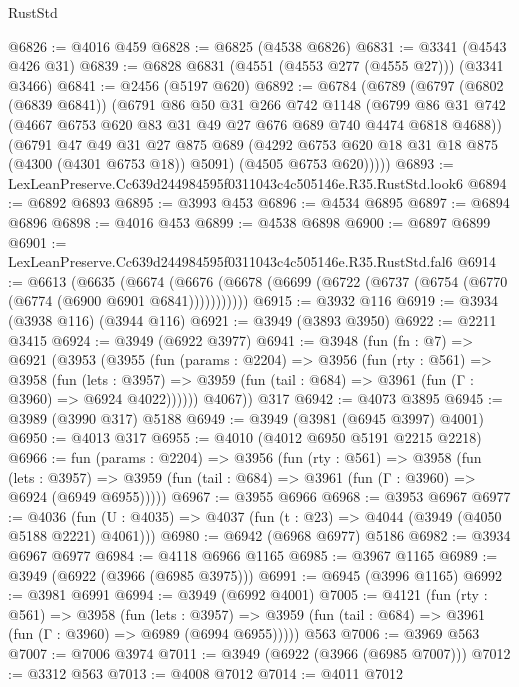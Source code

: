 \begin{lexlean}{RustStd}
\begin{coremodule}
@6826 := @4016 @459
@6828 := @6825 (@4538 @6826)
@6831 := @3341 (@4543 @426 @31)
@6839 := @6828 @6831 (@4551 (@4553 @277 (@4555 @27))) (@3341 @3466)
@6841 := @2456 (@5197 @620)
@6892 := @6784
    (@6789
      (@6797
        (@6802 (@6839 @6841))
        (@6791
          @86
          @50
          @31
          @266
          @742
          @1148
          (@6799 @86 @31 @742 (@4667 @6753 @620 @83 @31 @49 @27 @676 @689 @740 @4474 @6818 @4688))
          (@6791
            @47
            @49
            @31
            @27
            @875
            @689
            (@4292 @6753 @620 @18 @31 @18 @875 (@4300 (@4301 @6753 @18)) @5091)
            (@4505 @6753 @620)))))
@6893 := LexLeanPreserve.Cc639d244984595f0311043c4c505146e.R35.RustStd.look6
@6894 := @6892 @6893
@6895 := @3993 @453
@6896 := @4534 @6895
@6897 := @6894 @6896
@6898 := @4016 @453
@6899 := @4538 @6898
@6900 := @6897 @6899
@6901 := LexLeanPreserve.Cc639d244984595f0311043c4c505146e.R35.RustStd.fal6
@6914 := @6613
    (@6635
      (@6674 (@6676 (@6678 (@6699 (@6722 (@6737 (@6754 (@6770 (@6774 (@6900 @6901 @6841)))))))))))
@6915 := @3932 @116
@6919 := @3934 (@3938 @116) (@3944 @116)
@6921 := @3949 (@3893 @3950)
@6922 := @2211 @3415
@6924 := @3949 (@6922 @3977)
@6941 := @3948
    (fun (fn : @7) =>
    @6921
      (@3953
        (@3955
          (fun (params : @2204) =>
          @3956
            (fun (rty : @561) =>
            @3958
              (fun (lets : @3957) =>
              @3959 (fun (tail : @684) => @3961 (fun (Γ : @3960) => @6924 @4022))))))
        @4067))
    @317
@6942 := @4073 @3895
@6945 := @3989 (@3990 @317) @5188
@6949 := @3949 (@3981 (@6945 @3997) @4001)
@6950 := @4013 @317
@6955 := @4010 (@4012 @6950 @5191 @2215 @2218)
@6966 := fun (params : @2204) =>
  @3956
    (fun (rty : @561) =>
    @3958
      (fun (lets : @3957) =>
      @3959 (fun (tail : @684) => @3961 (fun (Γ : @3960) => @6924 (@6949 @6955)))))
@6967 := @3955 @6966
@6968 := @3953 @6967
@6977 := @4036 (fun (U : @4035) => @4037 (fun (t : @23) => @4044 (@3949 (@4050 @5188 @2221) @4061)))
@6980 := @6942 (@6968 @6977) @5186
@6982 := @3934 @6967 @6977
@6984 := @4118 @6966 @1165
@6985 := @3967 @1165
@6989 := @3949 (@6922 (@3966 (@6985 @3975)))
@6991 := @6945 (@3996 @1165)
@6992 := @3981 @6991
@6994 := @3949 (@6992 @4001)
@7005 := @4121
    (fun (rty : @561) =>
    @3958
      (fun (lets : @3957) =>
      @3959 (fun (tail : @684) => @3961 (fun (Γ : @3960) => @6989 (@6994 @6955)))))
    @563
@7006 := @3969 @563
@7007 := @7006 @3974
@7011 := @3949 (@6922 (@3966 (@6985 @7007)))
@7012 := @3312 @563
@7013 := @4008 @7012
@7014 := @4011 @7012

\end{coremodule}
\end{lexlean}
